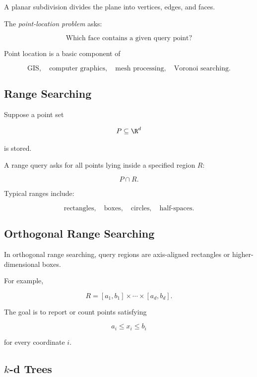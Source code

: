 A planar subdivision divides the plane into vertices, edges, and faces.

The \emph{point-location problem} asks:

\[
\boxed{
\text{Which face contains a given query point?}
}
\]

Point location is a basic component of

\[
\boxed{
\text{GIS},
\quad
\text{computer graphics},
\quad
\text{mesh processing},
\quad
\text{Voronoi searching}.
}
\]

\subsection{Range Searching}
\label{subsec:range-searching}

Suppose a point set

\[
P\subseteq\R^d
\]

is stored.

A range query asks for all points lying inside a specified region \(R\):

\[
\boxed{
P\cap R.
}
\]

Typical ranges include:

\[
\boxed{
\text{rectangles},
\quad
\text{boxes},
\quad
\text{circles},
\quad
\text{half-spaces}.
}
\]

\subsection{Orthogonal Range Searching}
\label{subsec:orthogonal-range-searching}

In orthogonal range searching, query regions are axis-aligned rectangles or
higher-dimensional boxes.

For example,

\[
R=
[a_1,b_1]\times\cdots\times[a_d,b_d].
\]

The goal is to report or count points satisfying

\[
\boxed{
a_i\leq x_i\leq b_i
}
\]

for every coordinate \(i\).

\subsection{\texorpdfstring{\(k\)-d Trees}{k-d Trees}}
\label{subsec:kd-trees}

